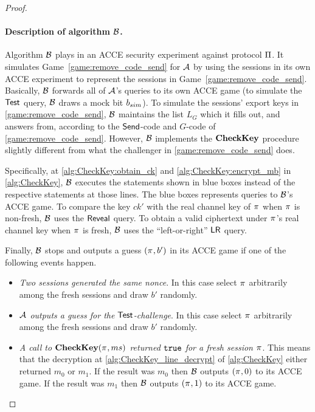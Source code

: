 \begin{proof}
\paragraph{Description of algorithm \texorpdfstring{$\A[B]$}{B}.}
Algorithm $\A[B]$ plays in an ACCE security experiment against protocol $\protocol$.
It simulates Game~\ref{game:remove_code_send} for $\A$ by using the sessions in its own ACCE experiment to represent the sessions in Game~\ref{game:remove_code_send}.
Basically,
$\A[B]$ forwards all of $\A$'s queries to its own ACCE game
(to simulate the $\Test$ query,
$\A[B]$ draws a mock bit $\bsim$).
To simulate the sessions' export keys in \cref{game:remove_code_send},
$\A[B]$ maintains the list $L_G$ which it fills out,
and answers from, 
according to the $\Send$-code and $G$-code of \cref{game:remove_code_send}.
However,
$\A[B]$ implements the $\CK$ procedure slightly different from what the challenger in \cref{game:remove_code_send} does. 

Specifically,
at \cref{alg:CheckKey:obtain_ck} and \cref{alg:CheckKey:encrypt_mb} in \cref{alg:CheckKey},
$\A[B]$ executes the statements shown in blue boxes instead of the respective statements at those lines.
The blue boxes represents queries to $\A[B]$'s ACCE game.
To compare the key $ck'$ with the real channel key of $\oracle$ when $\oracle$ is non-fresh,
$\A[B]$ uses the $\Reveal$ query.
To obtain a valid ciphertext under $\oracle$'s real channel key when $\oracle$ is fresh,
$\A[B]$ uses the ``left-or-right'' $\Encrypt$ query.


Finally,
$\A[B]$ stops and outputs a guess $(\oracle, b')$ in its ACCE game if one of the following events happen.


\begin{itemize}
	\item \emph{Two sessions generated the same nonce}.
	In this case select $\oracle$ arbitrarily among the fresh sessions and draw $b'$ randomly.
	
	\item \emph{$\A$ outputs a guess for the $\Test$-challenge}.
	In this case select $\oracle$ arbitrarily among the fresh sessions and draw $b'$ randomly.
	
	\item \emph{A call to $\CK(\oracle, ms)$ returned $\TRUE$ for a fresh session $\oracle$}.	
	This means that the decryption at \cref{alg:CheckKey_line_decrypt} of \cref{alg:CheckKey} either returned $m_0$ or $m_1$.
	If the result was $m_0$ then $\A[B]$ outputs $(\oracle, 0)$ to its ACCE game.
	If the result was $m_1$ then $\A[B]$ outputs $(\oracle, 1)$ to its ACCE game.
	

\end{itemize}
\end{proof}
